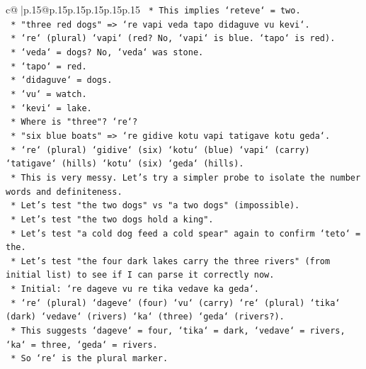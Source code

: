 \documentclass{article}
\begin{document}
{\begin{supertabular}{c@{$\;$}|p{.15\linewidth}@{}p{.15\linewidth}p{.15\linewidth}p{.15\linewidth}p{.15\linewidth}p{.15\linewidth}}
{{{\texttt{                    *   This implies `reteve` = two.} \\
\texttt{                *   "three red dogs" => `re vapi veda tapo didaguve vu kevi`.} \\
\texttt{                    *   `re` (plural) `vapi` (red? No, `vapi` is blue. `tapo` is red).} \\
\texttt{                    *   `veda` = dogs? No, `veda` was stone.} \\
\texttt{                    *   `tapo` = red.} \\
\texttt{                    *   `didaguve` = dogs.} \\
\texttt{                    *   `vu` = watch.} \\
\texttt{                    *   `kevi` = lake.} \\
\texttt{                    *   Where is "three"? `re`?} \\
\texttt{                *   "six blue boats" => `re gidive kotu vapi tatigave kotu geda`.} \\
\texttt{                    *   `re` (plural) `gidive` (six) `kotu` (blue) `vapi` (carry) `tatigave` (hills) `kotu` (six) `geda` (hills).} \\
\texttt{                    *   This is very messy. Let's try a simpler probe to isolate the number words and definiteness.} \\
\texttt{                *   Let's test "the two dogs" vs "a two dogs" (impossible).} \\
\texttt{                *   Let's test "the two dogs hold a king".} \\
\texttt{                *   Let's test "a cold dog feed a cold spear" again to confirm `teto` = the.} \\
\texttt{                *   Let's test "the four dark lakes carry the three rivers" (from initial list) to see if I can parse it correctly now.} \\
\texttt{                *   Initial: `re dageve vu re tika vedave ka geda`.} \\
\texttt{                    *   `re` (plural) `dageve` (four) `vu` (carry) `re` (plural) `tika` (dark) `vedave` (rivers) `ka` (three) `geda` (rivers?).} \\
\texttt{                    *   This suggests `dageve` = four, `tika` = dark, `vedave` = rivers, `ka` = three, `geda` = rivers.} \\
\texttt{                    *   So `re` is the plural marker.} \\
}}}
\end{supertabular}}
\end{document}
